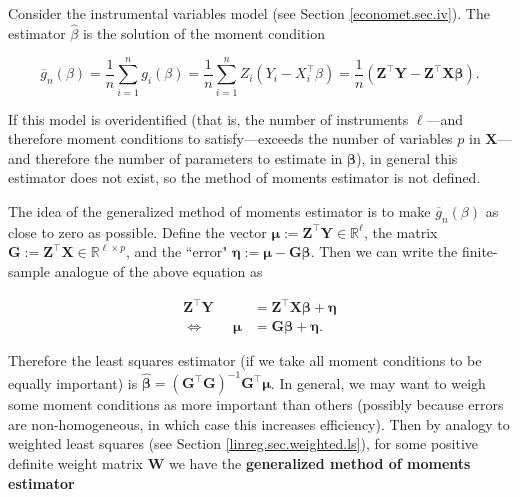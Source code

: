 Consider the instrumental variables model (see Section \ref{economet.sec.iv}). The estimator \(\hat{\beta}\) is the solution of the moment condition

\[
\overline{g}_n(\beta) = \frac{1}{n} \sum_{i=1}^n g_i(\beta) = \frac{1}{n}\sum_{i=1}^n Z_i(Y_i - X_i^\top \beta) = \frac{1}{n} \left( \boldsymbol{Z}^\top \boldsymbol{Y} - \boldsymbol{Z}^\top \boldsymbol{X} \boldsymbol{\beta}\right).
\]
 
If this model is overidentified (that is, the number of instruments \(\ell\)---and therefore moment conditions to satisfy---exceeds the number of variables \(p\) in \(\boldsymbol{X}\)---and therefore the number of parameters to estimate in \(\boldsymbol{\beta}\)), in general this estimator does not exist, so the method of moments estimator is not defined.

The idea of the generalized method of moments estimator is to make \(\overline{g}_n(\beta)\) as close to zero as possible. Define the vector \(\boldsymbol{\mu} := \boldsymbol{Z}^\top \boldsymbol{Y} \in \mathbb{R}^{\ell}\), the matrix \(\boldsymbol{G} := \boldsymbol{Z}^\top \boldsymbol{X} \in \mathbb{R}^{\ell \times p}\), and the ``error" \(\boldsymbol{\eta} := \boldsymbol{\mu} - \boldsymbol{G} \boldsymbol{\beta}\). Then we can write the finite-sample analogue of the above equation as

\begin{align*}
\boldsymbol{Z}^\top \boldsymbol{Y}  & = \boldsymbol{Z}^\top \boldsymbol{X} \boldsymbol{\beta} + \boldsymbol{\eta}
\\ \iff \qquad  \boldsymbol{\mu} &= \boldsymbol{G}\boldsymbol{\beta}  +  \boldsymbol{\eta}.
\end{align*}

Therefore the least squares estimator (if we take all moment conditions to be equally important) is \(\hat{\boldsymbol{\beta}} = \left( \boldsymbol{G}^\top  \boldsymbol{G} \right)^{-1}  \boldsymbol{G}^\top \boldsymbol{\mu}\). In general, we may want to weigh some moment conditions as more important than others (possibly because errors are non-homogeneous, in which case this increases efficiency). Then by analogy to weighted least squares (see Section \ref{linreg.sec.weighted.ls}), for some positive definite weight matrix \(\boldsymbol{W}\) we have the \textbf{generalized method of moments estimator}

